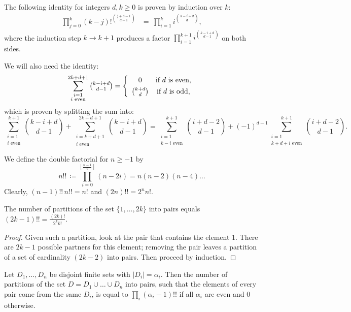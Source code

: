 The following identity for integers $d,k\geq 0$ is proven by induction over $k$:
\begin{align} \label{facprod1}
\prod_{j=0}^k (k-j)!^{\binom{j+d-1}{d-1}} &= \ \prod_{i=1}^k i^{\binom{k-i+d}{d}},
\end{align}
where the induction step $k\rightarrow k+1$ produces a factor $\prod\limits_{i=1}^{k+1} i^{\binom{k-i+d}{d-1} }$ on both sides.

We will also need the identity:
\begin{equation} \label{evensum}
\sum_{\substack{i=1\\i\text{ even}}}^{2k+d+1}\textstyle \binom{k-i+d}{d-1} = \left\{ 
 \begin{array}{*2{c}p{5cm}}0 &\text{if }d\text{ is even}, \vspace{1mm}\\
 \binom{k+d}{d} &\text{if }d\text{ is odd},
\end{array}\right.
\end{equation}
which is proven by splitting the sum into:
$$
\sum_{\substack{i=1\\i\text{ even}}}^{k+1} \textstyle\binom{k-i+d}{d-1} + \displaystyle\sum_{\substack{i=k+d+1\\i\text{ even}}}^{2k+d+1}\textstyle \binom{k-i+d}{d-1}
= \displaystyle\sum_{\substack{i=1\\k-i\text{ even}}}^{k+1}\!\! \textstyle\binom{i+d-2}{d-1} +(-1)^{d-1} \!\!\!\!
 \displaystyle\sum_{\substack{i=1\\k+d+i\text{ even}}}^{k+1} \!\!\!\! \textstyle\binom{i+d-2}{d-1} .
$$

\begin{definition}\label{doublefactorial}
We define the double factorial for $ n\geq -1$ by 
$$n!! \,\coloneqq \prod_{i=0}^{\left\lfloor\!\frac{n-1}{2}\!\right\rfloor }(n-2i)=n(n-2)(n-4)\ldots $$
Clearly, $(n-1)!!\,n!! = n!$ and $(2n)!! = 2^n n!$.
\end{definition}
\begin{proposition} \label{partitioncount}
The number of partitions of the set $\{1,\ldots,2k\}$ into pairs equals $(2k-1)!! = \frac{(2k)!}{2^kk!}$.
\end{proposition}
\begin{proof}
Given such a partition, look at the pair that contains the element $1$. There are $2k-1$ possible partners for this element; removing the pair leaves a partition of a set of cardinality $(2k-2)$ into pairs. Then proceed by induction.
\end{proof}
\begin{corollary} \label{multipairs}
Let $D_1,\ldots,D_n$ be disjoint finite sets with $|D_i|=\alpha_i$. Then the number of partitions of the set $D = D_1\cup\ldots\cup D_n$ into pairs, such that the elements of every pair come from the same $D_i$, is equal to $\prod_i (\alpha_i -1)!!$ if all $\alpha_i$ are even and $0$ otherwise.
\end{corollary}



